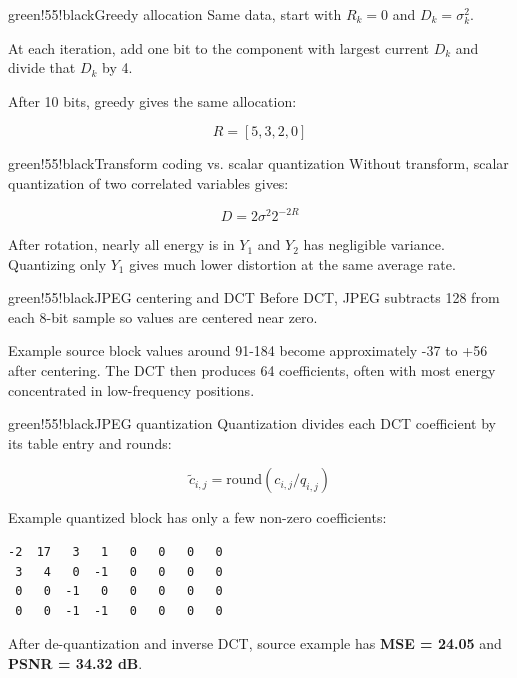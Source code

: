 \begin{calloutbox}{green!55!black}{Greedy allocation}
Same data, start with $R_k=0$ and $D_k=\sigma_k^2$.

At each iteration, add one bit to the component with largest current $D_k$ and divide that $D_k$ by 4.

After 10 bits, greedy gives the same allocation:

\[
R=[5,3,2,0]
\]
\end{calloutbox}

\begin{calloutbox}{green!55!black}{Transform coding vs. scalar quantization}
Without transform, scalar quantization of two correlated variables gives:

\[
D=2\sigma^2 2^{-2R}
\]

After rotation, nearly all energy is in $Y_1$ and $Y_2$ has negligible variance. Quantizing only $Y_1$ gives much lower distortion at the same average rate.

\begin{center}
\end{center}
\end{calloutbox}

\begin{calloutbox}{green!55!black}{JPEG centering and DCT}
Before DCT, JPEG subtracts 128 from each 8-bit sample so values are centered near zero.

Example source block values around 91-184 become approximately -37 to +56 after centering. The DCT then produces 64 coefficients, often with most energy concentrated in low-frequency positions.
\end{calloutbox}

\begin{calloutbox}{green!55!black}{JPEG quantization}
Quantization divides each DCT coefficient by its table entry and rounds:

\[
\tilde{c}_{i,j}=\mathrm{round}(c_{i,j}/q_{i,j})
\]

Example quantized block has only a few non-zero coefficients:

\begin{verbatim}
-2  17   3   1   0   0   0   0
 3   4   0  -1   0   0   0   0
 0   0  -1   0   0   0   0   0
 0   0  -1  -1   0   0   0   0
\end{verbatim}

After de-quantization and inverse DCT, source example has \textbf{MSE = 24.05} and \textbf{PSNR = 34.32 dB}.
\end{calloutbox}

